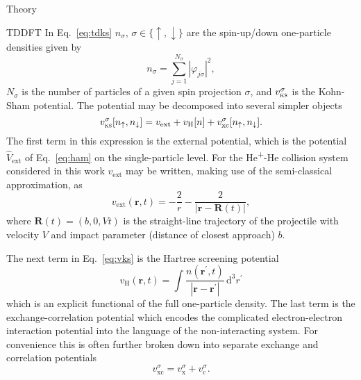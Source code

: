 \documentclass[aps, pra, reprint, groupedaddress, amsfonts, longbibliography,
               amsmath, amssymb, showpacs, nofootinbib]{revtex4-1}
\begin{document}
\begin{section}{Theory \label{sec:theory}}
\begin{subsection}{TDDFT \label{sec:tddft}}
      In Eq.~\eqref{eq:tdks} $n_\sigma$, $\sigma \in \{ \uparrow, \downarrow \}$ are the spin-up/down
      one-particle densities given by
      \begin{equation} \label{eq:spinden}
         n_\sigma = \sum\limits_{j=1}^{N_\sigma} \left| \varphi_{j\sigma} \right|^2,
      \end{equation}
      $N_\sigma$ is the number of particles of a given spin projection $\sigma$, and
      $v^\sigma_\textsc{ks}$ is the Kohn-Sham potential. The potential may be decomposed into several
      simpler objects
      \begin{equation} \label{eq:vks}
         v^\sigma_\mathrm{\textsc{ks}}[n_\uparrow, n_\downarrow] = v_\mathrm{ext} + v_\mathrm{H}[n]
                                                   + v^\sigma_\mathrm{xc}[n_\uparrow, n_\downarrow].
      \end{equation}
      The first term in this expression is the external potential, which is the potential
      $\hat{V}_\mathrm{ext}$ of Eq.~\eqref{eq:ham} on the single-particle level. For the
      He\textsuperscript{+}-He collision system considered in this work $v_\mathrm{ext}$ may be written,
      making use of the semi-classical approximation, as
      \begin{equation} \label{eq:hephe-ext}
         v_\mathrm{ext}(\mathbf{r},t) = -\frac{2}{r} 
         - \frac{2}{\left| \mathbf{r} - \mathbf{R}(t) \right|},
      \end{equation}
      where $\mathbf{R}(t) = (b,0,V t)$ is the straight-line trajectory of the projectile with velocity
      $V$ and impact parameter (distance of closest approach) $b$.
      
      The next term in Eq.~\eqref{eq:vks} is the Hartree screening potential
      \begin{equation} \label{eq:vh}
         v_\mathrm{H}(\mathbf{r},t) = \int \frac{n(\mathbf{r}^\prime, t)}
            {\left| \mathbf{r} - \mathbf{r}^\prime\right|} \, \mathrm{d}^3 r^\prime
      \end{equation}
      which is an explicit functional of the full one-particle density. The last term is the
      exchange-correlation potential which encodes the complicated electron-electron interaction
      potential into the language of the non-interacting system. For convenience this is often further
      broken down into separate exchange and correlation potentials
      \begin{equation} \label{eq:vxc}
         v^\sigma_\mathrm{xc} = v^\sigma_\mathrm{x} + v^\sigma_\mathrm{c}.
      \end{equation}


\end{subsection}
\end{section}
\end{document}
